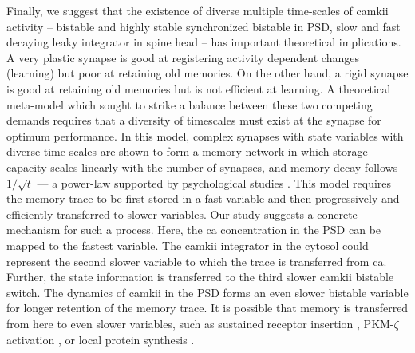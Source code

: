 \documentclass[9pt,lineno,doublespacing]{elife}
\begin{document}
Finally, we suggest that the existence of diverse multiple time-scales of
\gls{camkii} activity -- bistable and highly stable synchronized bistable in
PSD, slow and fast decaying leaky integrator in spine head -- has important
theoretical implications. A very plastic synapse is good at registering activity
dependent changes (learning) but poor at retaining old memories. On the other
hand, a rigid synapse is good at retaining old memories but is not efficient at
learning. A theoretical meta-model which sought to strike a balance between
these two competing demands requires that a diversity of timescales must exist
at the synapse \citep{benna_computational_2016} for optimum performance. In
this model, complex synapses with state variables with diverse time-scales are
shown to form a memory network in which storage capacity scales linearly with
the number of synapses, and memory decay follows \(1/\sqrt{t}\) --- a power-law
supported by psychological studies \citep{wixted_form_1991}. This model requires
the memory trace to be first stored in a fast variable and then progressively
and efficiently transferred to slower variables. Our study suggests a concrete
mechanism for such a process. Here, the \gls{ca} concentration in the PSD can be
mapped to the fastest variable. The \gls{camkii} integrator in the cytosol could
represent the second slower variable to which the trace is transferred from
\gls{ca}. Further, the state information is transferred to the third slower
\gls{camkii} bistable switch. The dynamics of \gls{camkii} in the PSD forms an
even slower bistable variable for longer retention of the memory trace. It is
possible that memory is transferred from here to even slower variables, such as
sustained receptor insertion \citep{hayer_molecular_2005}, PKM-$\zeta$
activation \citep{sacktor_memory_2012}, or local protein synthesis
\citep{aslam_translational_2009}.

\end{document}
